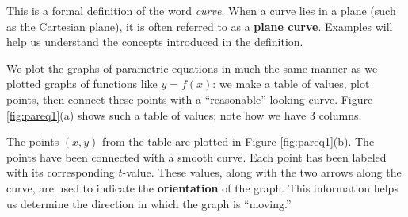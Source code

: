 This is a formal definition of the word \textit{curve}. When a curve lies in a plane (such as the Cartesian plane), it is often referred to as a \textbf{plane curve}. Examples will help us understand the concepts introduced in the definition.\\

{We plot the graphs of parametric equations in much the same manner as we plotted graphs of functions like $y=f(x)$: we make a table of values, plot points, then connect these points with a ``reasonable'' looking curve. Figure \ref{fig:pareq1}(a) shows such a table of values; note how we have 3 columns.

The points $(x,y)$ from the table are plotted in Figure \ref{fig:pareq1}(b). The points have been connected with a smooth curve. Each point has been labeled with its corresponding $t$-value. These values, along with the two arrows along the curve, are used to indicate the \textbf{orientation} of the graph. This information helps us determine the direction in which the graph is ``moving.''
}\\

